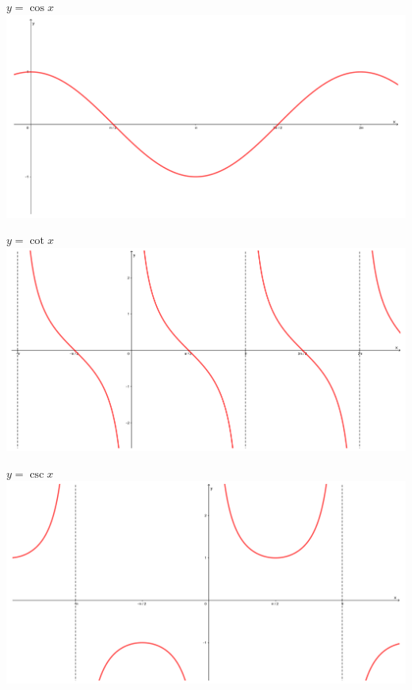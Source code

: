 \begin{minipage}[c]{0.5\textwidth}
\begin{center}
\end{center}
\end{minipage} \begin{minipage}[c]{0.5\textwidth}
\begin{center} 
$y=\cos x$\\
\includegraphics[scale=0.1]{Grap/cos}
\end{center}
\begin{center}
$y=\cot x$\\
\includegraphics[scale=0.08]{Grap/cot}
\end{center}
\begin{center}
$y=\csc x$\\
\includegraphics[scale=0.09]{Grap/csc}
\end{center}
\end{minipage}
